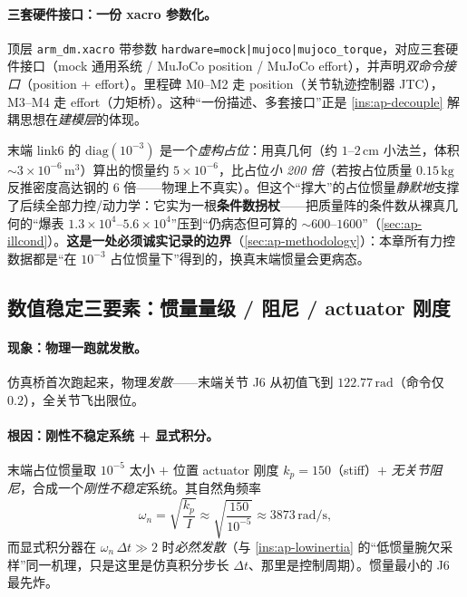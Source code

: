 \paragraph{三套硬件接口：一份 xacro 参数化。}
顶层 \texttt{arm\_dm.xacro} 带参数 \texttt{hardware=mock|mujoco|mujoco\_torque}，对应三套硬件接口（mock 通用系统 / MuJoCo position / MuJoCo effort），并声明\emph{双命令接口}（position + effort）。里程碑 M0--M2 走 position（关节轨迹控制器 JTC），M3--M4 走 effort（力矩桥）。这种“一份描述、多套接口”正是 \cref{ins:ap-decouple} 解耦思想在\emph{建模层}的体现。

\begin{insight}\label{ins:ap-placeholder}
末端 link6 的 $\mathrm{diag}(10^{-3})$ 是一个\emph{虚构占位}：用真几何（约 $1$--$2\,\mathrm{cm}$ 小法兰，体积 $\sim3\times10^{-6}\,\mathrm{m^3}$）算出的惯量约 $5\times10^{-6}$，比占位\emph{小 200 倍}（若按占位质量 $0.15\,\mathrm{kg}$ 反推密度高达钢的 $6$ 倍——物理上不真实）。但这个“撑大”的占位惯量\emph{静默地}支撑了后续全部力控/动力学：它实为一根\textbf{条件数拐杖}——把质量阵的条件数从裸真几何的“爆表 $1.3\!\times\!10^4$--$5.6\!\times\!10^4$”压到“仍病态但可算的 $\sim 600$--$1600$”（\cref{sec:ap-illcond}）。\textbf{这是一处必须诚实记录的边界}（\cref{sec:ap-methodology}）：本章所有力控数据都是“在 $10^{-3}$ 占位惯量下”得到的，换真末端惯量会更病态。
\end{insight}

\subsection{数值稳定三要素：惯量量级 / 阻尼 / actuator 刚度}
\label{sec:ap-num-explode}

\paragraph{现象：物理一跑就发散。}
仿真桥首次跑起来，物理\emph{发散}——末端关节 J6 从初值飞到 $122.77\,\mathrm{rad}$（命令仅 $0.2$），全关节飞出限位。

\paragraph{根因：刚性不稳定系统 + 显式积分。}
末端占位惯量取 $10^{-5}$ 太小 $+$ 位置 actuator 刚度 $k_p=150$（stiff）$+$ \emph{无关节阻尼}，合成一个\emph{刚性不稳定}系统。其自然角频率
\begin{equation}
  \omega_n=\sqrt{\frac{k_p}{I}}\approx\sqrt{\frac{150}{10^{-5}}}\approx 3873\,\mathrm{rad/s},
  \label{eq:ap-omegan}
\end{equation}
而显式积分器在 $\omega_n\,\Delta t\gg 2$ 时\emph{必然发散}（与 \cref{ins:ap-lowinertia} 的“低惯量腕欠采样”同一机理，只是这里是仿真积分步长 $\Delta t$、那里是控制周期）。惯量最小的 J6 最先炸。

